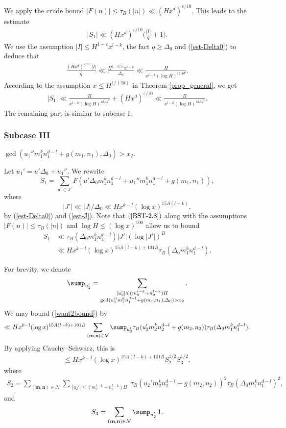 \documentclass[reqno, 11pt]{amsart}
\renewcommand{\leq}{\leqslant}
\renewcommand{\geq}{\geqslant}
\theoremstyle{definition}
\theoremstyle{definition}
\renewcommand{\geq}{\geqslant}
\renewcommand{\leq}{\leqslant}
\newcommand{\eps}{\varepsilon}
\newcommand{\mm}{\mathbf{m}}
\newcommand{\nn}{\mathbf{n}}
\numberwithin{equation}{section}
\begin{document}
We apply the crude bound $|F(n)| \leq \tau_B(|n|) \ll (Hx^d)^{\eps/10}$. This leads to the estimate
\begin{align*}
	|S_1| \ll (H x^d)^{\eps/10} \Big( \frac{|I|}{q} + 1 \Big).
\end{align*}
We use the assumption $|I| \leq H^{1 - \eps} x^{l-k}$, the fact $q \geq \Delta_0$ and (\ref{est-Delta0}) to deduce that
\begin{align*}
	 \frac{(H x^d)^{\eps/10} \, |I|}{q} \ll \frac{H^{1 - 0.7 \eps}x^{l-k}}{\Delta_0} \ll \frac{H}{x^{l-k}(\log H)^{12Ad^2}}.
\end{align*}
According to the assumption $x \leq H^{1/(2d)}$ in Theorem \ref{prop_general}, we get
\begin{align*}
	|S_1| \ll \frac{H}{x^{l-k}(\log H)^{12Ad^2}} + (H x^d)^{\eps/10} \ll \frac{H}{x^{l-k}(\log H)^{12Ad^2}}.
\end{align*}
The remaining part is similar to subcase I.



\subsubsection*{Subcase III}
 $\gcd(u_1'' m_1^k n_1^{d-l} + g(m_1,n_1), \Delta_0) > x_2$.

Let $u_1' = u' \Delta_0 + u_1''$. We rewrite
$$S_1 = \sum_{u' \in J'} F(u' \Delta_0 m_1^k n_1^{d-l} + u_1'' m_1^k n_1^{d-l} + g(m_1,n_1)),$$
where 
$$|J'| \ll |J| / \Delta_0 \ll H x^{k-l} 
(\log x)^{15A(l-k)},$$
by (\ref{est-Delta0}) and (\ref{est-J}).
Note that $(\ref{BST-2.8})$ along with the assumptions $|F(n)| \leq \tau_B(|n|)$ and $\log H \leq (\log x)^{100}$ allow us to bound 
\begin{align*}
    S_1  & \ll \tau_B(\Delta_0 m_1^k n_1^{d-l}) |J'| (\log |J'|)^B \\
    & \ll H x^{k-l} (\log x)^{15A(l-k) + 101B} \tau_B(\Delta_0 m_1^k n_1^{d-l}).
\end{align*}

For brevity, we denote
$$\sump_{u_2'}  = \sum_{\substack{|u_2'| \leq (m_2^{l-k} + n_2^{l-k}) H \\ \gcd(u_1'' m_1^k n_1^{d-l} + g(m_1,n_1), \Delta_0) > x_2}}.$$
We may bound (\ref{want2bound}) by
\begin{align*}
\ll H x^{k-l} (\log x)^{15A(l-k)+101B}  \sum_{(\mm,\nn) \in \mathcal{N}} \sump_{u_2'} \tau_B (u_2' m_2^k n_2^{d-l} + g(m_2,n_2)) \tau_B(\Delta_0 m_1^kn_1^{d-l}).
\end{align*}
By applying Cauchy--Schwarz, this is
\begin{align}\label{sc3-1}
    \leq H x^{k-l} (\log x)^{15A(l-k)+101B} S_2^{1/2} S_3^{1/2},
\end{align}
where
\begin{align*}
    S_2  = \sum_{(\mm,\nn)\in \mathcal{N}} \sum_{\substack{|u_2'| \leq (m_2^{l-k} + n_2^{l-k}) H}} \tau_B (u_2' m_2^k n_2^{d-l} + g(m_2,n_2))^2 \tau_B(\Delta_0 m_1^kn_1^{d-l})^2,
\end{align*}
and
\begin{align*}
    S_3 = \sum_{(\mm,\nn) \in \mathcal{N}} \sump_{u_2'} \, 1.
\end{align*}
\end{document}

